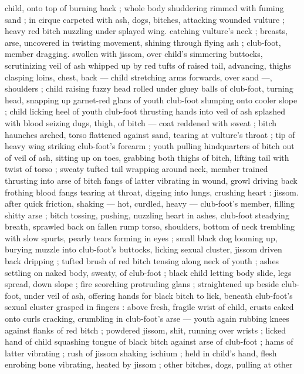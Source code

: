 child, onto top of burning back ; whole body shuddering rimmed with 
fuming sand ; in cirque carpeted with ash, dogs, bitches, attacking 
wounded vulture ; heavy red bitch nuzzling under splayed wing. 
catching vulture's neck ; breasts, arse, uncovered in twisting 
movement, shining through flying ash ; club-foot, member dragging. 
swollen with jissom, over child's simmering buttocks, scrutinizing veil 
of ash whipped up by red tufts of raised tail, advancing, thighs 
clasping loins, chest, back --- child stretching arms forwards, over 
sand ---, shoulders ; child raising fuzzy head rolled under gluey balls 
of club-foot, turning head, snapping up garnet-red glans of youth 
club-foot slumping onto cooler slope ; child licking heel of youth 
club-foot thrusting hands into veil of ash splashed with blood 
seizing dugs, thigh, of bitch --- coat reddened with sweat ; bitch 
haunches arched, torso flattened against sand, tearing at vulture's 
throat ; tip of heavy wing striking club-foot's forearm ; youth pulling 
hindquarters of bitch out of veil of ash, sitting up on toes, grabbing 
both thighs of bitch, lifting tail with twist of torso ; sweaty tufted tail 
wrapping around neck, member trained thrusting into arse of bitch 
fangs of latter vibrating in wound, growl driving back frothing blood 
fangs tearing at throat, digging into lungs, crushing heart : jissom. 
after quick friction, shaking --- hot, curdled, heavy --- club-foot's 
member, filling shitty arse ; bitch tossing, pushing, nuzzling heart in 
ashes, club-foot steadying breath, sprawled back on fallen rump 
torso, shoulders, bottom of neck trembling with slow spurts, pearly 
tears forming in eyes ; small black dog looming up, burying muzzle 
into club-foot's buttocks, licking sexual cluster, jissom driven back 
dripping ; tufted brush of red bitch tensing along neck of youth ; 
ashes settling on naked body, sweaty, of club-foot ; black child 
letting body slide, legs spread, down slope ; fire scorching 
protruding glans ; straightened up beside club-foot, under veil of 
ash, offering hands for black bitch to lick, beneath club-foot's sexual 
cluster grasped in fingers : above fresh, fragile wrist of child, crusts 
caked onto curls cracking, crumbling in club-foot's arse --- youth 
again rubbing knees against flanks of red bitch ; powdered jissom, 
shit, running over wrists ; licked hand of child squashing tongue of 
black bitch against arse of club-foot ; hams of latter vibrating ; rush 
of jissom shaking ischium ; held in child's hand, flesh enrobing bone 
vibrating, heated by jissom ; other bitches, dogs, pulling at other 
